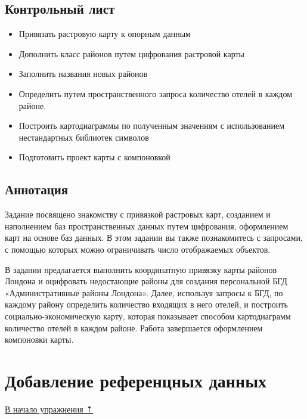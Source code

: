 \documentclass[]{book}
\providecommand{\tightlist}{%
  \setlength{\itemsep}{0pt}\setlength{\parskip}{0pt}}
\theoremstyle{definition}
\theoremstyle{definition}
\theoremstyle{definition}
\theoremstyle{remark}
\begin{document}
\hypertarget{map-ref-economic-control}{%
\subsection{Контрольный лист}\label{map-ref-economic-control}}

\begin{itemize}
\tightlist
\item
  Привязать растровую карту к опорным данным
\item
  Дополнить класс районов путем цифрования растровой карты
\item
  Заполнить названия новых районов
\item
  Определить путем пространственного запроса количество отелей в каждом
  районе.
\item
  Построить картодиаграммы по полученным значениям с использованием
  нестандартных библиотек символов
\item
  Подготовить проект карты с компоновкой
\end{itemize}

\hypertarget{map-ref-economic-annotation}{%
\subsection{Аннотация}\label{map-ref-economic-annotation}}

Задание посвящено знакомству с привязкой растровых карт, созданием и
наполнением баз пространственных данных путем цифрования, оформлением
карт на основе баз данных. В этом задании вы также познакомитесь с
запросами, с помощью которых можно ограничивать число отображаемых
объектов.

В задании предлагается выполнить координатную привязку карты районов
Лондона и оцифровать недостающие районы для создания персональной БГД
«Административные районы Лондона». Далее, используя запросы к БГД, по
каждому району определить количество входящих в него отелей, и построить
социально-экономическую карту, которая показывает способом картодиаграмм
количество отелей в каждом районе. Работа завершается оформлением
компоновки карты.

\hypertarget{map-ref-economic-reference}{%
\section{Добавление референцных
данных}\label{map-ref-economic-reference}}

\protect\hyperlink{map-ref-economic}{В начало упражнения ⇡}
\end{document}
